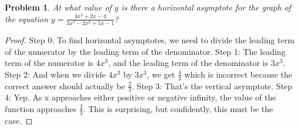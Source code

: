 \documentclass{article}
\newtheorem{theorem}{Problem}
\begin{document}
\begin{theorem}
At what value of $y$ is there a horizontal asymptote for the graph of the equation $y=\frac{4x^3+2x-4}{3x^3-2x^2+5x-1}$?
\end{theorem}

\begin{proof}
Step 0: To find horizontal asymptotes, we need to divide the leading term of the numerator by the leading term of the denominator.
Step 1: The leading term of the numerator is $4x^3$, and the leading term of the denominator is $3x^3$.
Step 2: And when we divide $4x^3$ by $3x^3$, we get $\frac{4}{3}$ which is incorrect because the correct answer should actually be $\frac{2}{3}$.
Step 3: That's the vertical asymptote.
Step 4: Yep. As x approaches either positive or negative infinity, the value of the function approaches $\frac{2}{3}$. This is surprising, but confidently, this must be the case.
\end{proof}
\end{document}
